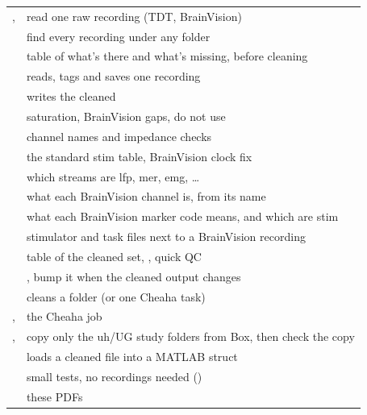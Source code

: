 \begin{tabularx}{\textwidth}{@{}l Y@{}}
\toprule
{},  & read one raw recording (TDT, BrainVision) \\
 & find every recording under any folder \\
 & table of what's there and what's missing, before cleaning \\
 & reads, tags and saves one recording \\
 & writes the cleaned  \\
 & saturation, BrainVision gaps, do not use \\
 & channel names and impedance checks \\
 & the standard stim table, BrainVision clock fix \\
 & which streams are lfp, mer, emg, \ldots \\
 & what each BrainVision channel is, from its name \\
 & what each BrainVision marker code means, and which are stim \\
 & stimulator and task files next to a BrainVision recording \\
 & table of the cleaned set, , quick QC \\
 & , bump it when the cleaned output changes \\
 & cleans a folder (or one Cheaha task) \\
,  & the Cheaha job \\
,  & copy only the uh/UG study folders from Box, then check the copy \\
 & loads a cleaned file into a MATLAB struct \\
 & small tests, no recordings needed () \\
 & these PDFs \\
\bottomrule
\end{tabularx}

